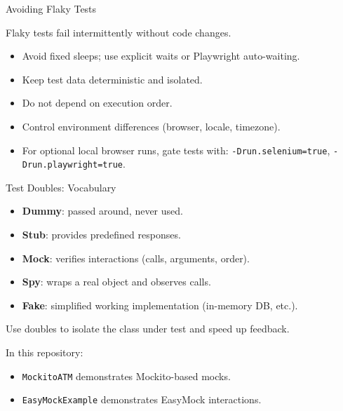 \documentclass[11pt, xcolor=svgnames]{beamer}
\providecommand{\alert}[1]{\textbf{#1}}
\begin{document}

\begin{frame}{Avoiding Flaky Tests}

Flaky tests fail intermittently without code changes.

\begin{itemize}
  \item Avoid fixed sleeps; use explicit waits or Playwright auto-waiting.
  \item Keep test data deterministic and isolated.
  \item Do not depend on execution order.
  \item Control environment differences (browser, locale, timezone).
  \item For optional local browser runs, gate tests with:
  \texttt{-Drun.selenium=true}, \texttt{-Drun.playwright=true}.
\end{itemize}

\end{frame}


\begin{frame}{Test Doubles: Vocabulary}

\begin{itemize}
  \item \alert{Dummy}: passed around, never used.
  \item \alert{Stub}: provides predefined responses.
  \item \alert{Mock}: verifies interactions (calls, arguments, order).
  \item \alert{Spy}: wraps a real object and observes calls.
  \item \alert{Fake}: simplified working implementation (in-memory DB, etc.).
\end{itemize}

Use doubles to isolate the class under test and speed up feedback.

In this repository:
\begin{itemize}
  \item \texttt{MockitoATM} demonstrates Mockito-based mocks.
  \item \texttt{EasyMockExample} demonstrates EasyMock interactions.
\end{itemize}

\end{frame}
\end{document}
